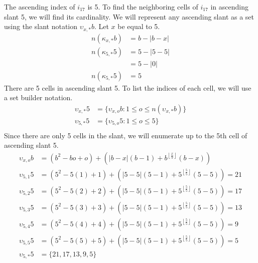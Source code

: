 \documentclass[letterpaper, twoside,12pt]{article}
\begin{document}
    The ascending index of $i_{17}$ is 5. To find the neighboring cells of $i_{17}$ in ascending slant 5, we will find its cardinality. We will represent any ascending slant as a set using the slant notation $\upsilon_{x,*}b$. Let $x$ be equal to 5.
    \begin{equation*}
        \begin{split}
            n(\kappa_{x,*}b) &= b - |b - x| \\
            n(\kappa_{5,*}5) &= 5 - |5 - 5| \\
                &= 5 - |0| \\
            n(\kappa_{5,*}5) &= 5
        \end{split}
    \end{equation*}
    There are 5 cells in ascending slant 5. To list the indices of each cell, we will use a set builder notation.
    \begin{equation*}
        \begin{split}
            \upsilon_{x,*}5 &= \{ \upsilon_{x,o}b : 1 \leq o \leq n(\upsilon_{x,*}b) \} \\
            \upsilon_{5,*}5 &= \{ \upsilon_{5,o}5 : 1 \leq o \leq 5 \} \\
        \end{split}
    \end{equation*}
    Since there are only 5 cells in the slant, we will enumerate up to the 5th cell of ascending slant 5.
    \begin{equation*}
        \begin{split}
            \upsilon_{x,o}b &= (b^2 - bo + o) + (|b-x|(b-1)+ b^{\left\lfloor \frac{x}{b} \right\rfloor}(b-x)) \\
            \upsilon_{5,1}5 &= (5^2 - 5(1) + 1) + (|5-5|(5-1)+ 5^{\left\lfloor \frac{5}{5} \right\rfloor}(5-5)) = 21\\
            \upsilon_{5,2}5 &= (5^2 - 5(2) + 2) + (|5-5|(5-1)+ 5^{\left\lfloor \frac{5}{5} \right\rfloor}(5-5)) = 17\\
            \upsilon_{5,3}5 &= (5^2 - 5(3) + 3) + (|5-5|(5-1)+ 5^{\left\lfloor \frac{5}{5} \right\rfloor}(5-5)) = 13\\
            \upsilon_{5,4}5 &= (5^2 - 5(4) + 4) + (|5-5|(5-1)+ 5^{\left\lfloor \frac{5}{5} \right\rfloor}(5-5)) = 9\\
            \upsilon_{5,5}5 &= (5^2 - 5(5) + 5) + (|5-5|(5-1)+ 5^{\left\lfloor \frac{5}{5} \right\rfloor}(5-5)) = 5\\
            \upsilon_{5,*}5 &= \{21, 17, 13, 9, 5\}
        \end{split}
    \end{equation*}
\end{document}
